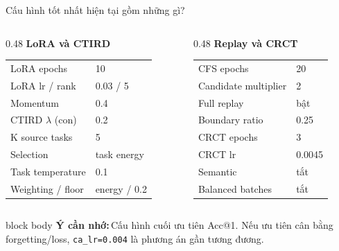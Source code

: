 \documentclass[aspectratio=169,10pt]{beamer}
\newcommand{\remember}[1]{%
  \par\vspace{0.12cm}%
  \begin{beamercolorbox}[wd=\linewidth,sep=0.11cm,leftskip=0.08cm,rightskip=0.08cm,rounded=true]{block body}
    \footnotesize\textbf{\color{HRMBlue}Ý cần nhớ:}\,\color{HRMDark}#1
  \end{beamercolorbox}
}
\begin{document}
\begin{frame}{Cấu hình tốt nhất hiện tại gồm những gì?}
  \small
  \begin{columns}[T,onlytextwidth]
    \begin{column}{0.48\textwidth}
      {\large\bfseries LoRA và CTIRD}\par\vspace{0.18cm}
      \begin{tabular}{ll}
        LoRA epochs & 10 \\
        LoRA lr / rank & 0.03 / 5 \\
        Momentum & 0.4 \\
        CTIRD $\lambda$ (con) & 0.2 \\
        K source tasks & 5 \\
        Selection & task energy \\
        Task temperature & 0.1 \\
        Weighting / floor & energy / 0.2 \\
      \end{tabular}
    \end{column}
    \begin{column}{0.48\textwidth}
      {\large\bfseries Replay và CRCT}\par\vspace{0.18cm}
      \begin{tabular}{ll}
        CFS epochs & 20 \\
        Candidate multiplier & 2 \\
        Full replay & bật \\
        Boundary ratio & 0.25 \\
        CRCT epochs & 3 \\
        CRCT lr & 0.0045 \\
        Semantic & tắt \\
        Balanced batches & tắt \\
      \end{tabular}
    \end{column}
  \end{columns}
  \remember{Cấu hình cuối ưu tiên Acc@1. Nếu ưu tiên cân bằng forgetting/loss, \texttt{ca\_lr=0.004} là phương án gần tương đương.}
\end{frame}
\end{document}
